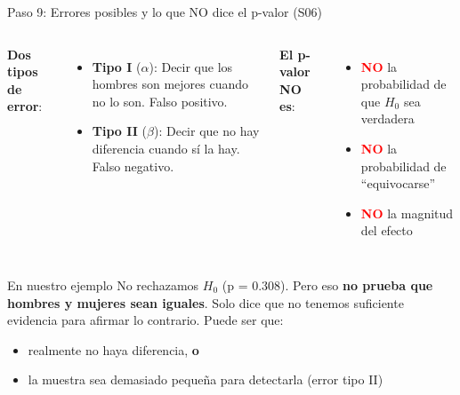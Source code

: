\documentclass[aspectratio=169, 11pt]{beamer}
\begin{document}
\begin{frame}{Paso 9: Errores posibles y lo que NO dice el p-valor (S06)}
\small

\begin{columns}[T]
\textbf{Dos tipos de error}:
\begin{itemize}\setlength{\itemsep}{4pt}
  \item \textbf{Tipo I} ($\alpha$): Decir que los hombres son mejores \alert{cuando no lo son}. Falso positivo.
  \item \textbf{Tipo II} ($\beta$): Decir que no hay diferencia \alert{cuando sí la hay}. Falso negativo.
\end{itemize}

\textbf{El p-valor NO es}:
\begin{itemize}\setlength{\itemsep}{4pt}
  \item \textcolor{red}{\textbf{NO}} la probabilidad de que $H_0$ sea verdadera
  \item \textcolor{red}{\textbf{NO}} la probabilidad de ``equivocarse''
  \item \textcolor{red}{\textbf{NO}} la magnitud del efecto
\end{itemize}
\end{columns}

\vspace{0.4cm}
\begin{alertblock}{En nuestro ejemplo}
No rechazamos $H_0$ (p = 0.308). Pero eso \textbf{no prueba que hombres y mujeres sean iguales}. Solo dice que no tenemos suficiente evidencia para afirmar lo contrario. Puede ser que:
\begin{itemize}
  \item realmente no haya diferencia, \textbf{o}
  \item la muestra sea demasiado pequeña para detectarla (error tipo II)
\end{itemize}
\end{alertblock}
\end{frame}
\end{document}

